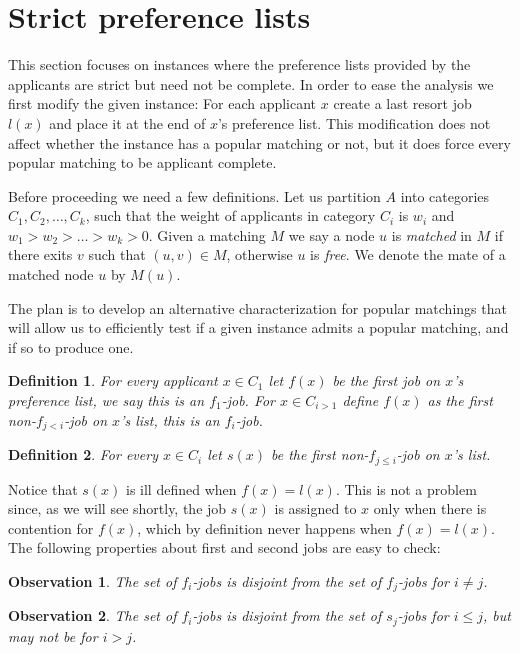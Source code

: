 \documentclass[11pt]{article}
\newcommand{\A}{A}
\newcommand{\first}{f}
\newcommand{\second}{s}
\newtheorem{definition}{Definition}
\newtheorem{observation}{Observation}
\begin{document}
\section{Strict preference lists}

This section focuses on instances where the preference lists provided by the applicants are strict but need not be complete. In order to ease the analysis we first modify the given instance: For each applicant $x$ create a last resort job $l(x)$ and place it at the end of $x$'s preference list. This modification does not affect whether the instance has a popular matching or not, but it does force every popular matching to be applicant complete.

Before proceeding we need a few definitions. Let us partition $\A$ into categories $C_1, C_2, \ldots, C_k$, such that the weight of applicants in category $C_i$ is $w_i$ and $w_1 > w_2 > \ldots > w_k > 0$. Given a matching $M$ we say a node $u$ is \emph{matched} in $M$ if there exits $v$ such that $(u,v) \in M$, otherwise $u$ is \emph{free}. We denote the mate of a matched node $u$ by $M(u)$.

The plan is to develop an alternative characterization for popular matchings that will allow us to efficiently test if a given instance admits a popular matching, and if so to produce one. 

\begin{definition} For every applicant $x \in C_1$ let $\first(x)$ be the first job on $x$'s preference list, we say this is an $\first_1$-job. For $x \in C_{i>1}$ define $\first(x)$ as the first non-$\first_{j<i}$-job on $x$'s list, this is an $\first_i$-job.
\end{definition} 

\begin{definition} For every $x \in C_i$ let $\second(x)$ be the first non-$\first_{j \leq i}$-job on $x$'s list.
\end{definition}

Notice that $\second(x)$ is ill defined when $\first(x) = l(x)$. This is not a problem since, as we will see shortly, the job $\second(x)$ is assigned to $x$ only when there is contention for $\first(x)$, which by definition never happens when $\first(x) =l(x)$. The following properties about first and second jobs are easy to check:

\begin{observation} The set of $\first_i$-jobs is disjoint from the set of $\first_j$-jobs for $i \neq j$.
\end{observation}
\begin{observation}  The set of $\first_i$-jobs is disjoint from the set of  $\second_j$-jobs for $i \leq j$, but may not be for $i > j$.
\end{observation}
\end{document}
